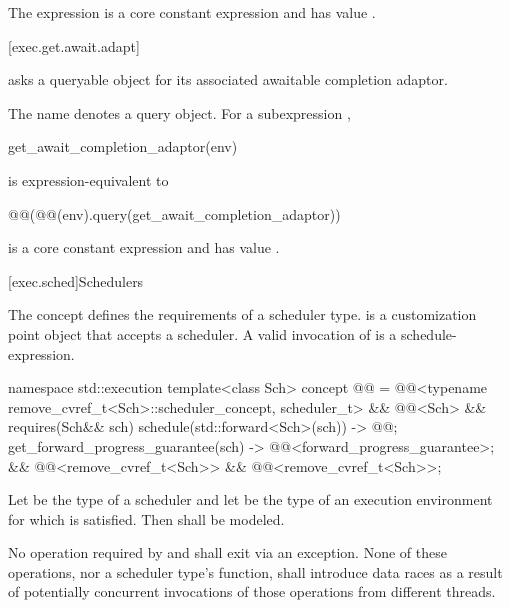 The expression
is a core constant expression and has value .

[exec.get.await.adapt]{}

\pnum
{} asks a queryable object for
its associated awaitable completion adaptor.

\pnum
The name  denotes a query object.
For a subexpression ,
\begin{codeblock}
get_await_completion_adaptor(env)
\end{codeblock}
is expression-equivalent to
\begin{codeblock}
@@(@@(env).query(get_await_completion_adaptor))
\end{codeblock}

\pnum
{}
is a core constant expression and has value .

[exec.sched]{Schedulers}

\pnum
The  concept defines
the requirements of a scheduler type.
 is a customization point object
that accepts a scheduler.
A valid invocation of  is a schedule-expression.
\begin{codeblock}
namespace std::execution {
  template<class Sch>
    concept @@ =
      @@<typename remove_cvref_t<Sch>::scheduler_concept, scheduler_t> &&
      @@<Sch> &&
      requires(Sch&& sch) {
        { schedule(std::forward<Sch>(sch)) } -> @@;
        { get_forward_progress_guarantee(sch) } -> @@<forward_progress_guarantee>;
      } &&
      @@<remove_cvref_t<Sch>> &&
      @@<remove_cvref_t<Sch>>;
}
\end{codeblock}

\pnum
Let  be the type of a scheduler and
let  be the type of an execution environment
for which 
is satisfied.
Then 
shall be modeled.

\pnum
No operation required by
 and
shall exit via an exception.
None of these operations,
nor a scheduler type's  function,
shall introduce data races
as a result of potentially concurrent invocations
of those operations from different threads.

